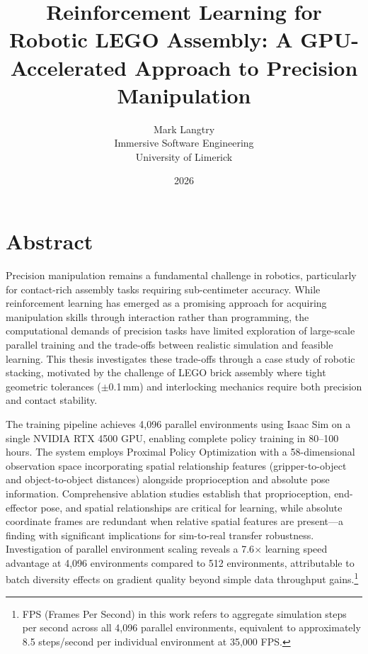 \documentclass[12pt,a4paper,oneside]{report}
\title{Reinforcement Learning for Robotic LEGO Assembly: A GPU-Accelerated Approach to Precision Manipulation}
\author{Mark Langtry \\ Immersive Software Engineering \\ University of Limerick}
\date{2026}
\begin{document}
\maketitle
\thispagestyle{empty}
\cleardoublepage

\chapter*{Abstract}

Precision manipulation remains a fundamental challenge in robotics, particularly for contact-rich assembly tasks requiring sub-centimeter accuracy. While reinforcement learning has emerged as a promising approach for acquiring manipulation skills through interaction rather than programming, the computational demands of precision tasks have limited exploration of large-scale parallel training and the trade-offs between realistic simulation and feasible learning. This thesis investigates these trade-offs through a case study of robotic stacking, motivated by the challenge of LEGO brick assembly where tight geometric tolerances ($\pm$0.1\,mm) and interlocking mechanics require both precision and contact stability.

The training pipeline achieves 4,096 parallel environments using Isaac Sim on a single NVIDIA RTX 4500 GPU, enabling complete policy training in 80--100 hours. The system employs Proximal Policy Optimization with a 58-dimensional observation space incorporating spatial relationship features (gripper-to-object and object-to-object distances) alongside proprioception and absolute pose information. Comprehensive ablation studies establish that proprioception, end-effector pose, and spatial relationships are critical for learning, while absolute coordinate frames are redundant when relative spatial features are present---a finding with significant implications for sim-to-real transfer robustness. Investigation of parallel environment scaling reveals a 7.6$\times$ learning speed advantage at 4,096 environments compared to 512 environments, attributable to batch diversity effects on gradient quality beyond simple data throughput gains.\footnote{FPS (Frames Per Second) in this work refers to aggregate simulation steps per second across all 4,096 parallel environments, equivalent to approximately 8.5 steps/second per individual environment at 35,000 FPS.}
\end{document}
